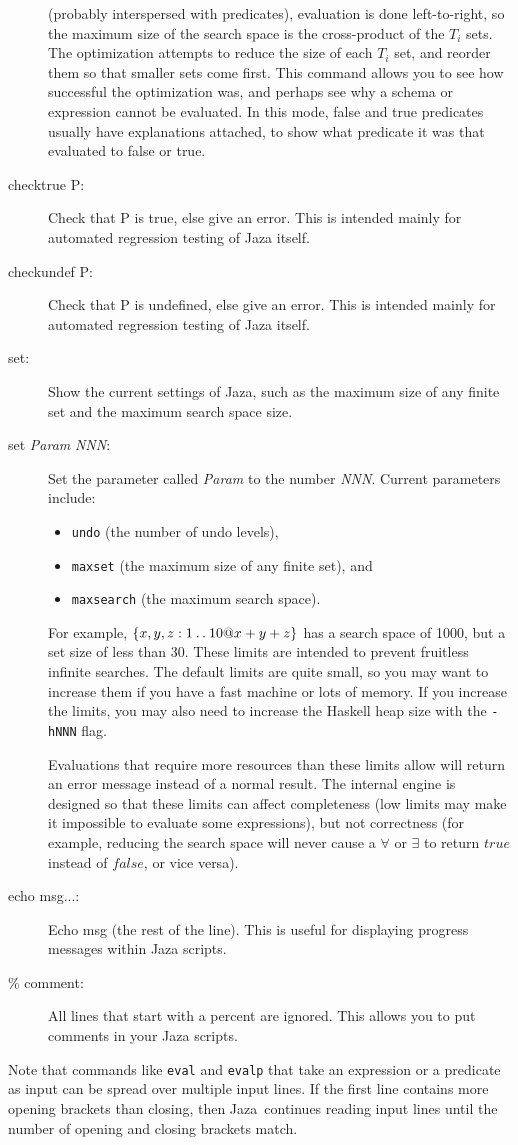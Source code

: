 \documentclass[11pt]{article}
\newcommand{\Jaza}{Jaza}
\begin{document}
\begin{description}
  (probably interspersed with predicates), evaluation is done
  left-to-right, so the maximum size of the search space is the
  cross-product of the $T_i$ sets.  The optimization attempts to
  reduce the size of each $T_i$ set, and reorder them so that
  smaller sets come first.  This command allows you to see
  how successful the optimization was, and perhaps see why a schema 
  or expression cannot be evaluated.  In this mode, false and true
  predicates usually have explanations attached, to show what predicate
  it was that evaluated to false or true.
\item[checktrue P:] Check that P is true, else give an error.
  This is intended mainly for automated regression testing
  of {\Jaza} itself.
\item[checkundef P:] Check that P is undefined, else give an error.
  This is intended mainly for automated regression testing
  of {\Jaza} itself.
\item[set:] Show the current settings of Jaza, such as the
  maximum size of any finite set and the maximum search space size.
\item[set \emph{Param} \emph{NNN}:] Set the parameter called \emph{Param}
  to the number \emph{NNN}.  Current parameters include:
  \begin{itemize}
  \item \texttt{undo} (the number of undo levels), 
  \item \texttt{maxset} (the maximum size of any finite set), and
  \item \texttt{maxsearch} (the maximum search space).
  \end{itemize}
  For example, $\{x,y,z:1\mathbin{\ldotp\ldotp} 10 @ x+y+z\}$ has a search space of
  1000, but a set size of less than 30.
  These limits are intended to prevent fruitless infinite searches.
  The default limits are quite small, so you may want to increase them
  if you have a fast machine or lots of memory.  If you increase the
  limits, you may also need to increase the Haskell heap size with the
  \texttt{-hNNN} flag.

  Evaluations that require more resources than these limits allow will return
  an error message instead of a normal result.  The internal engine
  is designed so that these limits can affect completeness (low limits may
  make it impossible to evaluate some expressions), but not correctness
  (for example, reducing the search space will never cause a $\forall$
  or $\exists$ to return $true$ instead of $false$, or vice versa).
\item[echo msg...:] Echo msg (the rest of the line).
  This is useful for displaying progress messages within {\Jaza} scripts.
\item[\% comment:] All lines that start with a percent are ignored.
  This allows you to put comments in your {\Jaza} scripts.
\end{description}
Note that commands like \texttt{eval} and \texttt{evalp} that take an
expression or a predicate as input can be spread over multiple input lines.
If the first line contains more opening brackets than closing, then \Jaza\
continues reading input lines until the number of opening and closing
brackets match. 
\end{document}
